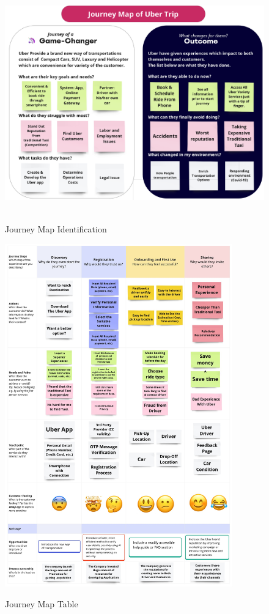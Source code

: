 \documentclass[12pt,a4paper]{article}
\begin{document}
\begin{figure}[htbp]
    \centering
    \includegraphics[width=1\textwidth]{images/Journey1.png}\
    \caption{Journey Map Identification}
    \label{fig:example}
\end{figure}


\begin{figure}[htbp]
    \centering
    \includegraphics[width=0.88\textwidth]{images/Journey2.jpg}\
    \caption{Journey Map Table}
    \label{fig:example}
\end{figure}
\end{document}
